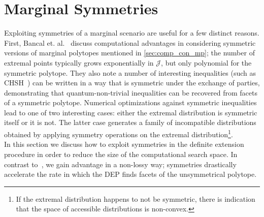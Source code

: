 \documentclass[aps, 10pt, english, twoside, pra, nofootinbib, longbibliography]{revtex4-1}
\theoremstyle{plain}
\theoremstyle{definition}
\theoremstyle{remark}
\newcommand{\jointvar}{\mathcal{J}}
\begin{document}
    \section{Marginal Symmetries}
    \label{sec:symmetry}
    Exploiting symmetries of a marginal scenario are useful for a few distinct reasons. First, Bancal et. al.~\cite{Bancal_2010} discuss computational advantages in considering symmetric versions of marginal polytopes mentioned in \cref{sec:comp_con_mp}; the number of extremal points typically grows exponentially in $\jointvar$, but only polynomial for the symmetric polytope. They also note a number of interesting inequalities (such as CHSH~\cite{CHSH_Original}) can be written in a way that is symmetric under the exchange of parties, demonstrating that quantum-non-trivial inequalities can be recovered from facets of a symmetric polytope. Numerical optimizations against symmetric inequalities lead to one of two interesting cases: either the extremal distribution is symmetric itself or it is not. The latter case generates a family of incompatible distributions obtained by applying symmetry operations on the extremal distribution\footnote{If the extremal distribution happens to not be symmetric, there is indication that the space of accessible distributions is non-convex.}.\\

    In this section we discuss how to exploit symmetries in the definite extension procedure in order to reduce the size of the computational search space. In contrast to~\cite{Bancal_2010}, we gain advantage in a non-lossy way; symmetries drastically accelerate the rate in which the DEP finds facets of the unsymmetrical polytope. \\
\end{document}
